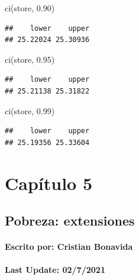 \documentclass[
]{book}
\newenvironment{Shaded}{\begin{snugshade}}{\end{snugshade}}
\newcommand{\FloatTok}[1]{\textcolor[rgb]{0.00,0.00,0.81}{#1}}
\newcommand{\FunctionTok}[1]{\textcolor[rgb]{0.00,0.00,0.00}{#1}}
\newcommand{\NormalTok}[1]{#1}
\begin{document}
\begin{Shaded}
\begin{Highlighting}[]
\FunctionTok{ci}\NormalTok{(store, }\FloatTok{0.90}\NormalTok{)}
\end{Highlighting}
\end{Shaded}

\begin{verbatim}
##    lower    upper 
## 25.22024 25.30936
\end{verbatim}

\begin{Shaded}
\begin{Highlighting}[]
\FunctionTok{ci}\NormalTok{(store, }\FloatTok{0.95}\NormalTok{)}
\end{Highlighting}
\end{Shaded}

\begin{verbatim}
##    lower    upper 
## 25.21138 25.31822
\end{verbatim}

\begin{Shaded}
\begin{Highlighting}[]
\FunctionTok{ci}\NormalTok{(store, }\FloatTok{0.99}\NormalTok{)}
\end{Highlighting}
\end{Shaded}

\begin{verbatim}
##    lower    upper 
## 25.19356 25.33604
\end{verbatim}

\hypertarget{capuxedtulo-5}{%
\chapter{Capítulo 5}\label{capuxedtulo-5}}

\hypertarget{pobreza-extensiones}{%
\section*{Pobreza: extensiones}\label{pobreza-extensiones}}

\hypertarget{escrito-por-cristian-bonavida-3}{%
\subsubsection*{Escrito por: Cristian Bonavida}\label{escrito-por-cristian-bonavida-3}}

\hypertarget{last-update-0272021-2}{%
\subsubsection*{Last Update: 02/7/2021}\label{last-update-0272021-2}}
\end{document}
